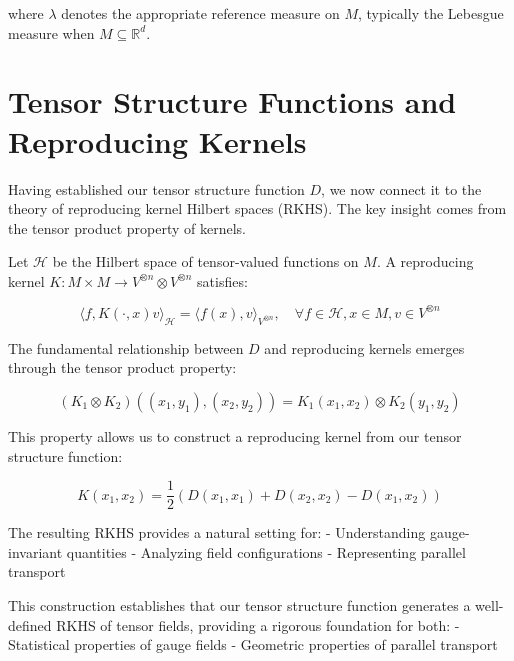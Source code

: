 \documentclass{article}
\begin{document}
where $\lambda$ denotes the appropriate reference measure on $M$, typically the Lebesgue measure when $M \subseteq \mathbb{R}^d$.

\section{Tensor Structure Functions and Reproducing Kernels}

Having established our tensor structure function $D$, we now connect it to the theory of reproducing kernel Hilbert spaces (RKHS). The key insight comes from the tensor product property of kernels.

Let $\mathcal{H}$ be the Hilbert space of tensor-valued functions on $M$. A reproducing kernel $K: M \times M \to V^{\otimes n} \otimes V^{\otimes n}$ satisfies:

\begin{equation}
\langle f, K(\cdot,x)v \rangle_{\mathcal{H}} = \langle f(x), v \rangle_{V^{\otimes n}}, \quad \forall f \in \mathcal{H}, x \in M, v \in V^{\otimes n}
\end{equation}

The fundamental relationship between $D$ and reproducing kernels emerges through the tensor product property:

\begin{equation}
(K_1 \otimes K_2)((x_1,y_1),(x_2,y_2)) = K_1(x_1,x_2) \otimes K_2(y_1,y_2)
\end{equation}

This property allows us to construct a reproducing kernel from our tensor structure function:

\begin{equation}
K(x_1,x_2) = \frac{1}{2}(D(x_1,x_1) + D(x_2,x_2) - D(x_1,x_2))
\end{equation}

The resulting RKHS provides a natural setting for:
- Understanding gauge-invariant quantities
- Analyzing field configurations
- Representing parallel transport

This construction establishes that our tensor structure function generates a well-defined RKHS of tensor fields, providing a rigorous foundation for both:
- Statistical properties of gauge fields
- Geometric properties of parallel transport
\end{document}
